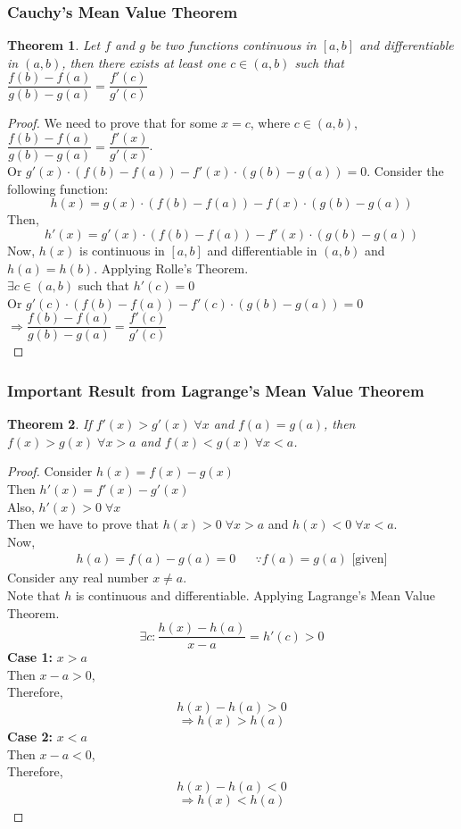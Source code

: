 \documentclass[14]{article}
\newtheorem{theorem}{Theorem}
\theoremstyle{definition}
\theoremstyle{case}
\begin{document}
\subsubsection{Cauchy's Mean Value Theorem}
\begin{theorem}
Let $f$ and $g$ be two functions continuous in $[a, b]$ and differentiable in $(a, b)$, then there exists at least one $c \in (a, b)$ such that $\dfrac{f(b) - f(a)}{g(b) - g(a)} = \dfrac{f'(c)}{g'(c)}$
\end{theorem}
\begin{proof}
We need to prove that for some $x = c$, where $c \in (a, b)$, $\dfrac{f(b) - f(a)}{g(b) - g(a)} = \dfrac{f'(x)}{g'(x)}$.\\
Or $g'(x) \cdot \left( f(b) - f(a) \right) - f'(x) \cdot \left( g(b) - g(a) \right) = 0$.
Consider the following function:
\[h(x) = g(x) \cdot \left( f(b) - f(a) \right) - f(x) \cdot \left( g(b) - g(a) \right)\]
Then,
\[h'(x) = g'(x) \cdot \left( f(b) - f(a) \right) - f'(x) \cdot \left( g(b) - g(a) \right)\]
Now, $h(x)$ is  continuous in $[a, b]$ and differentiable in $(a, b)$ and $h(a) = h(b)$. Applying Rolle's Theorem.\\
$\exists c \in (a, b)$ such that $h'(c) = 0$\\
Or $g'(c) \cdot \left( f(b) - f(a) \right) - f'(c) \cdot \left( g(b) - g(a) \right) = 0$\\
$\Rightarrow \dfrac{f(b) - f(a)}{g(b) - g(a)} = \dfrac{f'(c)}{g'(c)}$\\
\end{proof}
\pagebreak
\subsubsection{Important Result from Lagrange's Mean Value Theorem}
\begin{theorem}
If $f'(x) > g'(x) \; \forall x$ and $f(a) = g(a)$, then $f(x) > g(x) \; \forall x > a$ and $f(x) < g(x) \; \forall x < a$.
\end{theorem}
\begin{proof}
Consider $h(x) = f(x) - g(x)$\\
Then $h'(x) = f'(x) - g'(x)$\\
Also, $h'(x) > 0 \; \forall x$\\
Then we have to prove that $h(x) > 0 \; \forall x > a$ and $h(x) < 0 \; \forall x < a$.\\
Now,
\begin{align*}
h(a) = f(a) - g(a) = 0 && \because f(a) = g(a) \text{ [given]}
\end{align*}
Consider any real number $x \neq a$.\\
Note that $h$ is continuous and differentiable. Applying Lagrange's Mean Value Theorem.
\[\exists c : \dfrac{h(x) - h(a)}{x - a} = h'(c) > 0\]
\textbf{Case 1:} $x > a$\\
Then $x - a > 0$,\\
Therefore,\\
\[h(x) - h(a) > 0\]
\[\Rightarrow h(x) > h(a)\]
\textbf{Case 2:} $x < a$\\
Then $x - a < 0$,\\
Therefore,\\
\[h(x) - h(a) < 0\]
\[\Rightarrow h(x) < h(a)\]
\end{proof}
\pagebreak
\end{document}
